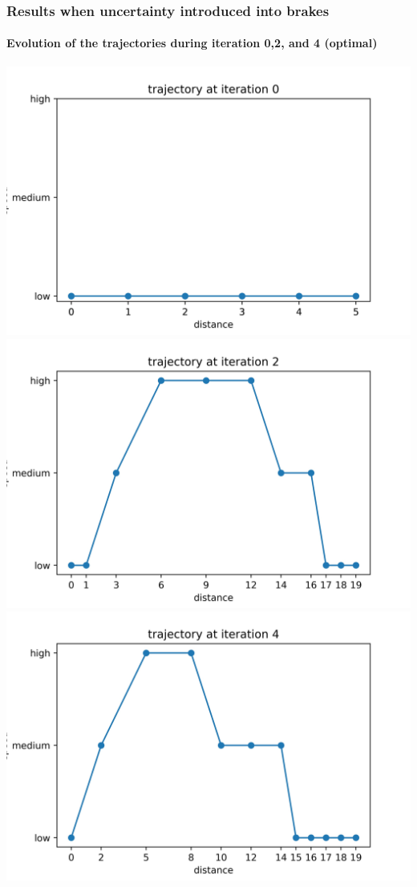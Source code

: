 \documentclass[dvipsnames,svgnames]{beamer}
\begin{document}
\begin{frame}
\frametitle{Results when uncertainty introduced into brakes}
\framesubtitle{Evolution of the trajectories during iteration 0,2, and 4 (optimal)}
\centering
\includegraphics[scale=0.35]{img/trajectory0.jpg}
\includegraphics[scale=0.35]{img/trajectory2.jpg}
\includegraphics[scale=0.35]{img/trajectory4.jpg}
\end{frame}
\end{document}
